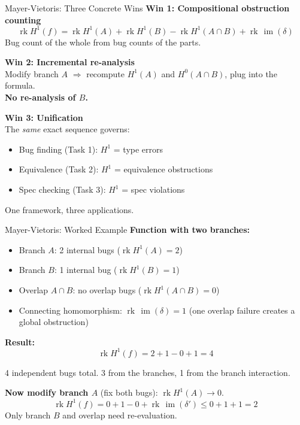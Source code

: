 \documentclass[aspectratio=169,10pt]{beamer}
\newcommand{\im}{\operatorname{im}}
\newcommand{\rk}{\operatorname{rk}}
\begin{document}
\begin{frame}{Mayer-Vietoris: Three Concrete Wins}
\textbf{Win 1: Compositional obstruction counting}
\[
\rk H^1(f) = \rk H^1(A) + \rk H^1(B) - \rk H^1(A \cap B) + \rk\,\im(\delta)
\]
Bug count of the whole from bug counts of the parts.

\vspace{0.3em}
\textbf{Win 2: Incremental re-analysis}\\
Modify branch $A$ $\Rightarrow$ recompute $H^1(A)$ and $H^0(A \cap B)$, plug into the formula.\\
\textbf{No re-analysis of $B$.}

\vspace{0.3em}
\textbf{Win 3: Unification}\\
The \emph{same} exact sequence governs:
\begin{itemize}
  \item Bug finding (Task 1): $H^1$ = type errors
  \item Equivalence (Task 2): $H^1$ = equivalence obstructions
  \item Spec checking (Task 3): $H^1$ = spec violations
\end{itemize}
One framework, three applications.
\end{frame}

\begin{frame}{Mayer-Vietoris: Worked Example}
\textbf{Function with two branches:}
\begin{itemize}
  \item Branch $A$: 2 internal bugs ($\rk H^1(A) = 2$)
  \item Branch $B$: 1 internal bug ($\rk H^1(B) = 1$)
  \item Overlap $A \cap B$: no overlap bugs ($\rk H^1(A \cap B) = 0$)
  \item Connecting homomorphism: $\rk\,\im(\delta) = 1$ (one overlap failure creates a global obstruction)
\end{itemize}

\vspace{0.3em}
\textbf{Result:}
\[
\rk H^1(f) = 2 + 1 - 0 + 1 = 4
\]

4 independent bugs total. 3 from the branches, 1 from the branch interaction.

\textbf{Now modify branch $A$} (fix both bugs): $\rk H^1(A) \to 0$.
\[
\rk H^1(f) = 0 + 1 - 0 + \rk\,\im(\delta') \leq 0 + 1 + 1 = 2
\]
Only branch $B$ and overlap need re-evaluation.
\end{frame}
\end{document}
